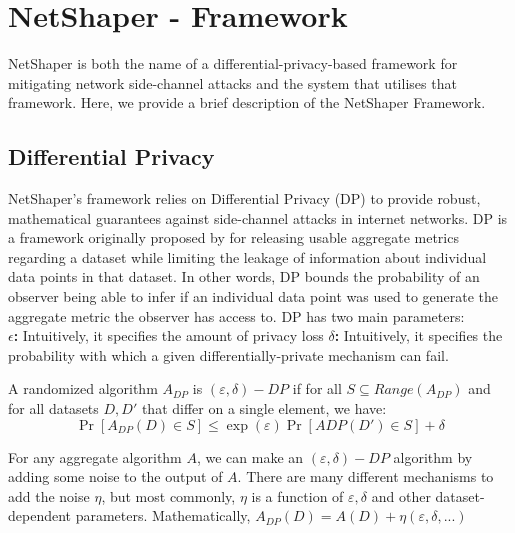 \section{NetShaper - Framework}
\label{sec:netshaper-framework-bg}

NetShaper \cite{sabzi2024netshaper} is both the name of a differential-privacy-based framework for mitigating network side-channel attacks and the system that utilises that framework. 
Here, we provide a brief description of the NetShaper Framework.

\subsection{Differential Privacy}
\label{subsec:dp-bg}
NetShaper's framework relies on Differential Privacy (DP) to provide robust, mathematical guarantees against side-channel attacks in internet networks.
DP is a framework originally proposed by \citeauthor{dwork2006differential} for releasing usable aggregate metrics regarding a dataset while limiting the leakage of information about individual data points in that dataset.
In other words, DP bounds the probability of an observer being able to infer if an individual data point was used to generate the aggregate metric the observer has access to.
DP has two main parameters: \\
\textbf{$\epsilon$: } Intuitively, it specifies the amount of privacy loss
\textbf{$\delta$: } Intuitively, it specifies the probability with which a given differentially-private mechanism can fail.


\begin{definition}
  \label{def:dp}
  A randomized algorithm $A_{DP}$ is $(\varepsilon, \delta)-DP$ if for all ${S} \subseteq Range(A_{DP})$ and for all datasets $D, D'$ that differ on a single element, we have:
  \begin{equation*}
    \Pr[A_{DP}(D) \in S] \leq \exp(\varepsilon)\Pr[A{DP}(D') \in S] + \delta
  \end{equation*}
\end{definition}

For any aggregate algorithm $A$, we can make an $(\varepsilon, \delta)-DP$ algorithm by adding some noise to the output of $A$.
There are many different mechanisms to add the noise $\eta$, but most commonly, $\eta$ is a function of $\varepsilon, \delta$ and other dataset-dependent parameters. 
Mathematically, $A_{DP}(D) = A(D) + \eta(\varepsilon, \delta, ...)$

